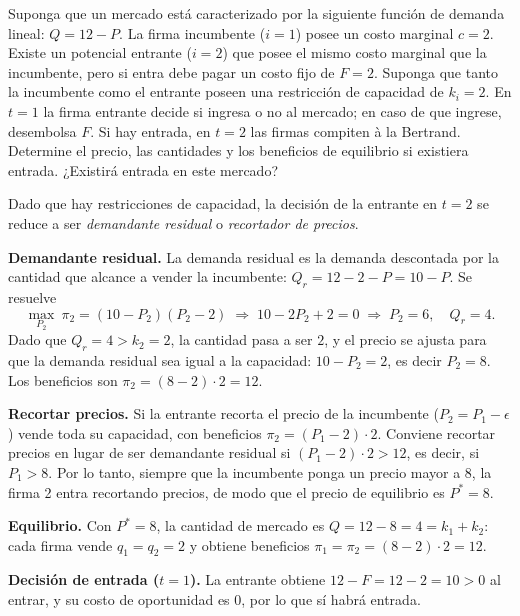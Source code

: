 \question Suponga que un mercado está caracterizado por la siguiente función de demanda lineal: $Q = 12 - P$. La firma incumbente ($i=1$) posee un costo marginal $c = 2$. Existe un potencial entrante ($i=2$) que posee el mismo costo marginal que la incumbente, pero si entra debe pagar un costo fijo de $F = 2$. Suponga que tanto la incumbente como el entrante poseen una restricción de capacidad de $k_i = 2$. En $t=1$ la firma entrante decide si ingresa o no al mercado; en caso de que ingrese, desembolsa $F$. Si hay entrada, en $t=2$ las firmas compiten à la Bertrand. Determine el precio, las cantidades y los beneficios de equilibrio si existiera entrada. ¿Existirá entrada en este mercado?
\begin{solution}
Dado que hay restricciones de capacidad, la decisión de la entrante en $t=2$ se reduce a ser \emph{demandante residual} o \emph{recortador de precios}.

\textbf{Demandante residual.} La demanda residual es la demanda descontada por la cantidad que alcance a vender la incumbente: $Q_r = 12 - 2 - P = 10 - P$. Se resuelve
\[
  \max_{P_2}\ \pi_2 = (10 - P_2)(P_2 - 2)
  \;\Rightarrow\; 10 - 2P_2 + 2 = 0
  \;\Rightarrow\; P_2 = 6, \quad Q_r = 4 .
\]
Dado que $Q_r = 4 > k_2 = 2$, la cantidad pasa a ser $2$, y el precio se ajusta para que la demanda residual sea igual a la capacidad: $10 - P_2 = 2$, es decir $P_2 = 8$. Los beneficios son $\pi_2 = (8 - 2)\cdot 2 = 12$.

\textbf{Recortar precios.} Si la entrante recorta el precio de la incumbente ($P_2 = P_1 - \epsilon$) vende toda su capacidad, con beneficios $\pi_2 = (P_1 - 2)\cdot 2$. Conviene recortar precios en lugar de ser demandante residual si $(P_1 - 2)\cdot 2 > 12$, es decir, si $P_1 > 8$. Por lo tanto, siempre que la incumbente ponga un precio mayor a 8, la firma 2 entra recortando precios, de modo que el precio de equilibrio es $P^* = 8$.

\textbf{Equilibrio.} Con $P^* = 8$, la cantidad de mercado es $Q = 12 - 8 = 4 = k_1 + k_2$: cada firma vende $q_1 = q_2 = 2$ y obtiene beneficios $\pi_1 = \pi_2 = (8-2)\cdot 2 = 12$.

\textbf{Decisión de entrada ($t=1$).} La entrante obtiene $12 - F = 12 - 2 = 10 > 0$ al entrar, y su costo de oportunidad es 0, por lo que sí habrá entrada.

\end{solution}

